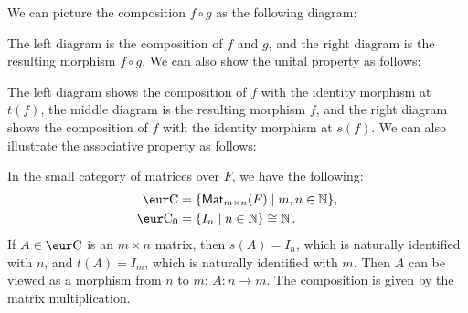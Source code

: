 We can picture the composition $f \circ g$ as the following diagram:
\begin{center}
  \qquad
\end{center}
The left diagram is the composition of $f$ and $g$, and the right diagram is the resulting morphism $f \circ g$. We can also show the unital property as follows:
\begin{center}
  \qquad
  \qquad
\end{center}
The left diagram shows the composition of $f$ with the identity morphism at $t(f)$, the middle diagram is the resulting morphism $f$, and the right diagram shows the composition of $f$ with the identity morphism at $s(f)$. We can also illustrate the associative property as follows:
\begin{center}
\end{center}

\begin{example}
  In the small category of matrices over $F$, we have the following:
  \begin{align*}
    \Ca   & = \{ \Mat_{m \times n}(F) \mid m, n \in \N \}, \\
    \Ca_0 & = \{ I_n \mid n \in \N \} \cong \N.
  \end{align*}
  If $A \in \Ca$ is an $m \times n$ matrix, then $s(A) = I_n$, which is naturally identified with $n$, and $t(A) = I_m$, which is naturally identified with $m$. Then $A$ can be viewed as a morphism from $n$ to $m$: $A \colon n \to m$. The composition is given by the matrix multiplication.
\end{example}

